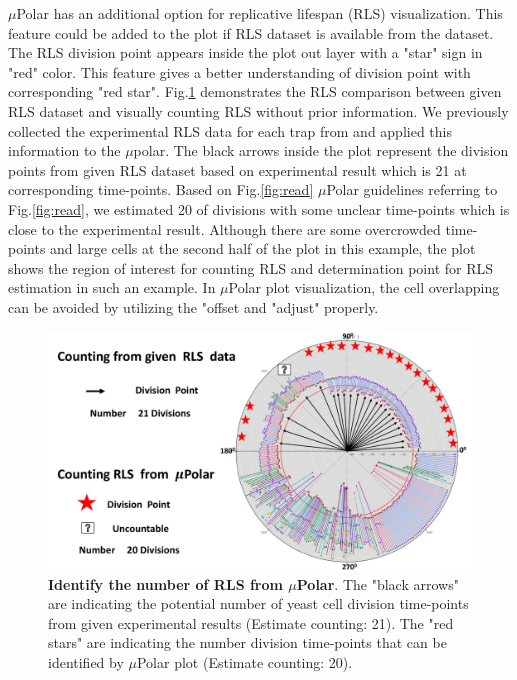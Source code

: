 \documentclass[conference]{IEEEtran}
\begin{document}
$\mu$Polar has an additional option for replicative lifespan (RLS) visualization. This feature could be added to the plot if RLS dataset is available from the dataset. The RLS division point appears inside the plot out layer with a "star" sign  in "red" color. This feature gives a better understanding of division point with corresponding "red star".  Fig.\ref{fig:rls} demonstrates the RLS comparison between given RLS dataset and visually  counting RLS without prior information. We previously collected the experimental RLS data for each trap from \cite{ref02.2} and applied this information to the $\mu$polar. The black arrows inside the plot represent the division points from given RLS dataset based on experimental result which is 21 at corresponding time-points. Based on Fig.\ref{fig:read} $\mu$Polar guidelines referring to Fig.\ref{fig:read}, we estimated 20 of divisions with some unclear time-points which is close to the experimental result. Although there are some overcrowded time-points and large cells at the second half of the plot in this example, the plot shows the region of interest for counting RLS and determination point for RLS estimation in such an example. In $\mu$Polar plot visualization, the cell overlapping can be avoided by utilizing the "offset and "adjust" properly.       

\begin{figure}
\centering
\includegraphics[width=\textwidth,height=10 cm]{Patterns/rlsTp1.pdf}
\caption{ \textbf{Identify the number of RLS from $\mu$Polar}. The "black arrows" are indicating the potential number of yeast cell division time-points from given experimental results (Estimate counting: 21). The "red stars" are indicating the number division time-points that can be identified by $\mu$Polar plot (Estimate counting: 20).}
\label{fig:rls}
\end{figure}
\end{document}
